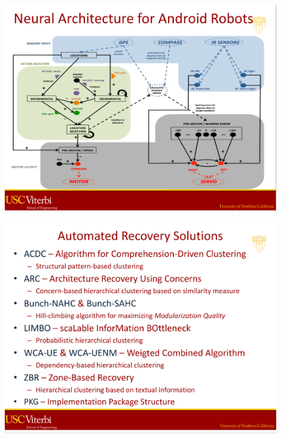 \documentclass[xetex,mathserif,serif]{beamer}
\begin{document}
	\begin{frame}
		\begin{center}
			\includegraphics[width=0.9\textwidth]{medvidovic3.png}
		\end{center}
	\end{frame}

	\begin{frame}
		\begin{center}
			\includegraphics[width=0.9\textwidth]{medvidovic4.png}
		\end{center}
	\end{frame}
\end{document}
